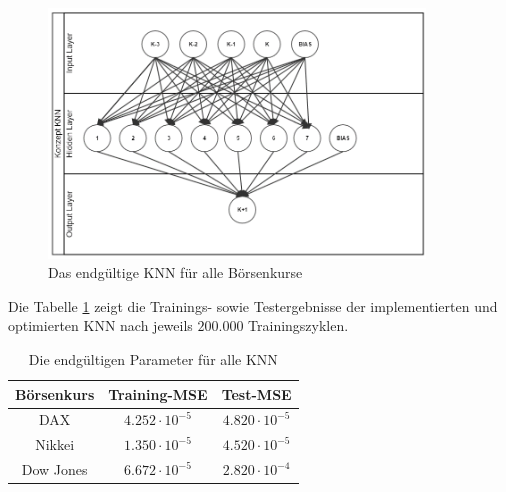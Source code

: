 \begin{figure}[H]
	\centering
	\includegraphics[width=10cm]{Bilder/Umsetzung/FertigKNN.PNG}
	\caption{Das endgültige KNN für alle Börsenkurse}
	\label{fig:ENDKNN}
\end{figure}

Die Tabelle \ref{tab:ENDval} zeigt die Trainings- sowie Testergebnisse der implementierten und optimierten KNN nach jeweils $200.000$ Trainingszyklen.

\begin{table}[H]
  \centering
  \begin{tabular}{|c|c|c|}
  \hline 
  \rule[0ex]{0pt}{2.5ex}  Börsenkurs & Training-MSE & Test-MSE\\ 
  \hline 
  \rule[0ex]{0pt}{2.5ex} DAX & $4.252\cdot10^{-5}$ & $4.820\cdot10^{-5}$  \\ 
  \hline 
  \rule[0ex]{0pt}{2.5ex} Nikkei & $1.350\cdot10^{-5}$ & $4.520\cdot10^{-5}$  \\ 
  \hline 
   \rule[0ex]{0pt}{2.5ex} Dow Jones & $6.672\cdot10^{-5}$ & $2.820\cdot10^{-4}$  \\ 
  \hline 
  \end{tabular} 
  \caption{Die endgültigen Parameter für alle KNN}
  \label{tab:ENDval}
\end{table}
